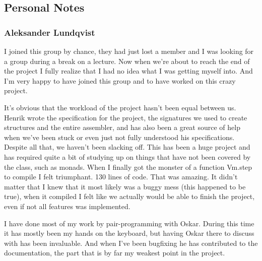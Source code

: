 \subsection{Personal Notes}

\subsubsection{Aleksander Lundqvist}
I joined this group by chance, they had just lost a member and I was looking for a group during a break on a lecture. Now when we're about to reach the end of the project I fully realize that I had no idea what I was getting myself into. And I'm very happy to have joined this group and to have worked on this crazy project.

It's obvious that the workload of the project hasn't been equal between us. Henrik wrote the specification for the project, the signatures we used to create structures and the entire assembler, and has also been a great source of help when we've been stuck or even just not fully understood his specifications. Despite all that, we haven't been slacking off. This has been a huge project and has required quite a bit of studying up on things that have not been covered by the class, such as monads. When I finally got the monster of a function Vm.step to compile I felt triumphant. 130 lines of code. That was amazing. It didn't matter that I knew that it most likely was a buggy mess (this happened to be true), when it compiled I felt like we actually would be able to finish the project, even if not all features was implemented.

I have done most of my work by pair-programming with Oskar. During this time it has mostly been my hands on the keyboard, but having Oskar there to discuss with has been invaluable. And when I've been bugfixing he has contributed to the documentation, the part that is by far my weakest point in the project. 